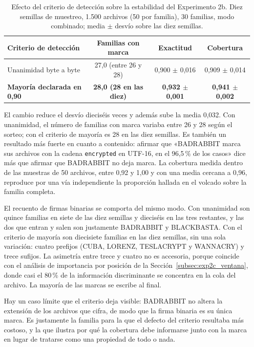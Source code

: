 \begin{table}[ht]
\centering
\caption{Efecto del criterio de detección sobre la estabilidad del Experimento 2b. Diez semillas de muestreo, 1.500 archivos (50 por familia), 30 familias, modo combinado; media $\pm$ desvío sobre las diez semillas.}
\label{tab:exp2b_criterio}
\small
\begin{tabular}{|l|c|c|c|}
\hline
\textbf{Criterio de detección} & \textbf{Familias con marca} & \textbf{Exactitud} & \textbf{Cobertura} \\
\hline
Unanimidad byte a byte & 27,0 \quad (entre 26 y 28) & 0,900 $\pm$ 0,016 & 0,909 $\pm$ 0,014 \\
\textbf{Mayoría declarada en 0,90} & \textbf{28,0 \quad (28 en las diez)} & \textbf{0,932 $\pm$ 0,001} & \textbf{0,941 $\pm$ 0,002} \\
\hline
\end{tabular}
\end{table}

El cambio reduce el desvío dieciséis veces y además sube la media 0,032. Con unanimidad, el número de familias con marca variaba entre 26 y 28 según el sorteo; con el criterio de mayoría es 28 en las diez semillas. Es también un resultado más fuerte en cuanto a contenido: afirmar que «BADRABBIT marca sus archivos con la cadena \texttt{encrypted} en UTF-16, en el 96,5\,\% de los casos» dice más que afirmar que BADRABBIT no deja marca. La cobertura medida dentro de las muestras de 50 archivos, entre 0,92 y 1,00 y con una media cercana a 0,96, reproduce por una vía independiente la proporción hallada en el volcado sobre la familia completa.

El recuento de firmas binarias se comporta del mismo modo. Con unanimidad son quince familias en siete de las diez semillas y dieciséis en las tres restantes, y las dos que entran y salen son justamente BADRABBIT y BLACKBASTA. Con el criterio de mayoría son diecisiete familias en las diez semillas, sin una sola variación: cuatro prefijos (CUBA, LORENZ, TESLACRYPT y WANNACRY) y trece sufijos. La asimetría entre trece y cuatro no es accesoria, porque coincide con el análisis de importancia por posición de la Sección~\ref{subsec:exp2c_ventana}, donde casi el 80\,\% de la información discriminante se concentra en la cola del archivo. La mayoría de las marcas se escribe al final.

Hay un caso límite que el criterio deja visible: BADRABBIT no altera la extensión de los archivos que cifra, de modo que la firma binaria es su única marca. Es justamente la familia para la que el defecto del criterio resultaba más costoso, y la que ilustra por qué la cobertura debe informarse junto con la marca en lugar de tratarse como una propiedad de todo o nada.


